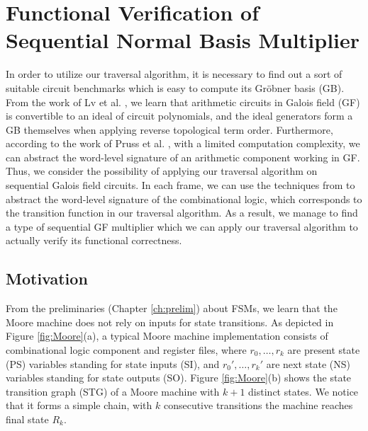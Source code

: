 \chapter{Functional Verification of Sequential Normal Basis Multiplier}
\label{ch:normal}
In order to utilize our traversal algorithm, it is necessary to find out
a sort of suitable circuit benchmarks which is easy to compute its
Gr\"obner basis (GB). From the work of Lv et al. \cite{lv_dissertation},
we learn that arithmetic circuits in Galois field (GF) is
convertible to an ideal of circuit polynomials, and the 
ideal generators form a GB themselves when applying reverse topological
term order. Furthermore, according to the work of Pruss et al.
\cite{tim_dissertation}, with a limited computation complexity,
we can abstract the word-level signature of an arithmetic 
component working in GF. Thus, we consider the possibility 
of applying our traversal algorithm on sequential Galois
field circuits. In each frame, we can use the techniques 
from \cite{tim_dissertation} to abstract the word-level
signature of the combinational logic, which corresponds
to the transition function in our traversal algorithm.
As a result, we manage to find a type of sequential GF multiplier
which we can apply our traversal algorithm to actually 
verify its functional correctness.

\section{Motivation}
\label{sec:normal_motiv}
From the preliminaries (Chapter \ref{ch:prelim}) about FSMs, we learn that the
Moore machine does not rely on inputs for state transitions. 
As depicted in Figure \ref{fig:Moore}(a), a typical Moore machine implementation
consists of combinational logic component and register files, where
$r_0,\dots,r_k$ are present state (PS) variables 
standing for state inputs (SI), and $r_0',\dots,r_k'$ are next state (NS) variables standing for
state outputs (SO). Figure \ref{fig:Moore}(b) shows the state transition graph (STG) of 
a Moore machine with $k+1$ distinct states. We notice that it forms a simple chain,
with $k$ consecutive transitions the machine reaches final state $R_k$.

\begin{figure}[H]
\end{figure}

